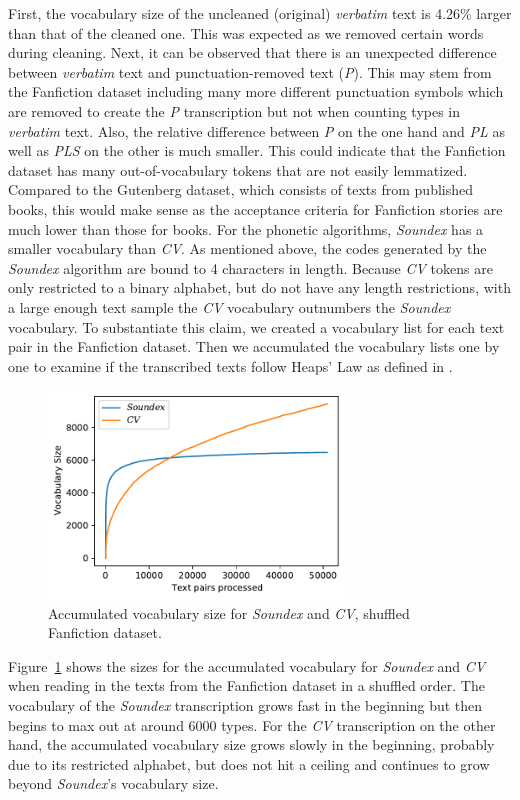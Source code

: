 First, the vocabulary size of the uncleaned (original) \textit{verbatim} text is 4.26\% larger than that of the cleaned one.
This was expected as we removed certain words during cleaning.
Next, it can be observed that there is an unexpected difference between \textit{verbatim} text and punctuation-removed text (\textit{P}).
This may stem from the Fanfiction dataset including many more different punctuation symbols which are removed to create the \textit{P} transcription but not when counting types in \textit{verbatim} text.
Also, the relative difference between \textit{P} on the one hand and \textit{PL} as well as \textit{PLS} on the other is much smaller.
This could indicate that the Fanfiction dataset has many out-of-vocabulary tokens that are not easily lemmatized.
Compared to the Gutenberg dataset, which consists of texts from published books, this would make sense as the acceptance criteria for Fanfiction stories are much lower than those for books.
For the phonetic algorithms, \textit{Soundex} has a smaller vocabulary than \textit{CV}.
As mentioned above, the codes generated by the \textit{Soundex} algorithm are bound to 4 characters in length.
Because \textit{CV} tokens are only restricted to a binary alphabet, but do not have any length restrictions, with a large enough text sample the \textit{CV} vocabulary outnumbers the \textit{Soundex} vocabulary.
To substantiate this claim, we created a vocabulary list for each text pair in the Fanfiction dataset.
Then we accumulated the vocabulary lists one by one to examine if the transcribed texts follow Heaps' Law as defined in \cite{schutze2008introduction}.
\begin{figure}
  \centering
  \includegraphics[width=0.7\textwidth]{figures/cum_vocab_size_ff_shuffled_soundexcv}
  \caption{Accumulated vocabulary size for \textit{Soundex} and \textit{CV}, shuffled Fanfiction dataset.}
  \label{fig:cumvocab_soundexcv}
\end{figure}
Figure~\ref{fig:cumvocab_soundexcv} shows the sizes for the accumulated vocabulary for \textit{Soundex} and \textit{CV} when reading in the texts from the Fanfiction dataset in a shuffled order.
The vocabulary of the \textit{Soundex} transcription grows fast in the beginning but then begins to max out at around 6000 types.
For the \textit{CV} transcription on the other hand, the accumulated vocabulary size grows slowly in the beginning, probably due to its restricted alphabet, but does not hit a ceiling and continues to grow beyond \textit{Soundex}'s vocabulary size.

